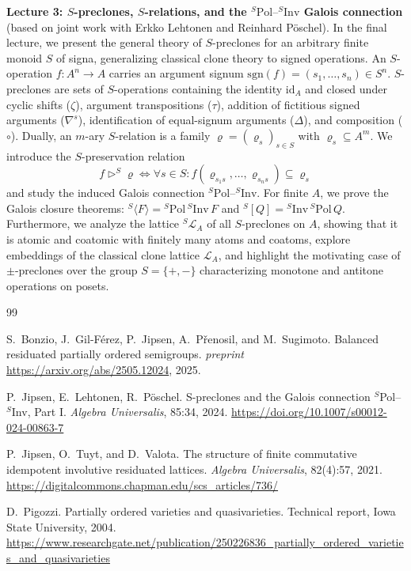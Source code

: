 \documentclass[a4paper]{article} %
\begin{document}
\noindent
\textbf{Lecture 3: $S$-preclones, $S$-relations, and the ${}^S\mathrm{Pol}\text{--}{}^S\mathrm{Inv}$ Galois connection} (based on joint work with Erkko Lehtonen and Reinhard P\"oschel).
In the final lecture, we present the general theory of $S$-preclones for an arbitrary finite monoid $S$ of signa, generalizing classical clone theory to signed operations. An $S$-operation $f: A^n \to A$ carries an argument signum $\mathrm{sgn}(f) = (s_1, \dots, s_n) \in S^n$. $S$-preclones are sets of $S$-operations containing the identity $\mathrm{id}_A$ and closed under cyclic shifts ($\zeta$), argument transpositions ($\tau$), addition of fictitious signed arguments ($\nabla^s$), identification of equal-signum arguments ($\Delta$), and composition ($\circ$). Dually, an $m$-ary $S$-relation is a family $\boldsymbol{\varrho} = (\varrho_s)_{s \in S}$ with $\varrho_s \subseteq A^m$. We introduce the $S$-preservation relation
\[
f \rhd^S \boldsymbol{\varrho} \iff \forall s \in S : f(\varrho_{s_1 s}, \dots, \varrho_{s_n s}) \subseteq \varrho_s
\]
and study the induced Galois connection ${}^S\mathrm{Pol}\text{--}{}^S\mathrm{Inv}$. For finite $A$, we prove the Galois closure theorems: ${}^S\langle F \rangle = {}^S\mathrm{Pol}\,{}^S\mathrm{Inv}\,F$ and ${}^S[Q] = {}^S\mathrm{Inv}\,{}^S\mathrm{Pol}\,Q$. Furthermore, we analyze the lattice ${}^S\mathcal{L}_A$ of all $S$-preclones on $A$, showing that it is atomic and coatomic with finitely many atoms and coatoms, explore embeddings of the classical clone lattice $\mathcal{L}_A$, and highlight the motivating case of $\pm$-preclones over the group $S = \{+, -\}$ characterizing monotone and antitone operations on posets.


\begin{thebibliography}{99}

S.~Bonzio, J.~Gil-F\'erez, P.~Jipsen, A.~P\v{r}enosil, and M.~Sugimoto.
\newblock Balanced residuated partially ordered semigroups.
\newblock \emph{preprint} \url{https://arxiv.org/abs/2505.12024}, 2025.

P.~Jipsen, E.~Lehtonen, R.~P\"oschel.
\newblock S-preclones and the Galois connection $^S$Pol--$^S$Inv, Part I.
\newblock \emph{Algebra Universalis}, 85:34, 2024. \url{https://doi.org/10.1007/s00012-024-00863-7}

P.~Jipsen, O.~Tuyt, and D.~Valota.
\newblock The structure of finite commutative idempotent involutive residuated lattices.
\newblock \emph{Algebra Universalis}, 82(4):57, 2021. 
\url{https://digitalcommons.chapman.edu/scs_articles/736/}

D.~Pigozzi.
\newblock Partially ordered varieties and quasivarieties.
\newblock Technical report, Iowa State University, 2004. 
\small\url{https://www.researchgate.net/publication/250226836_partially_ordered_varieties_and_quasivarieties}

\end{thebibliography}
\end{document}
